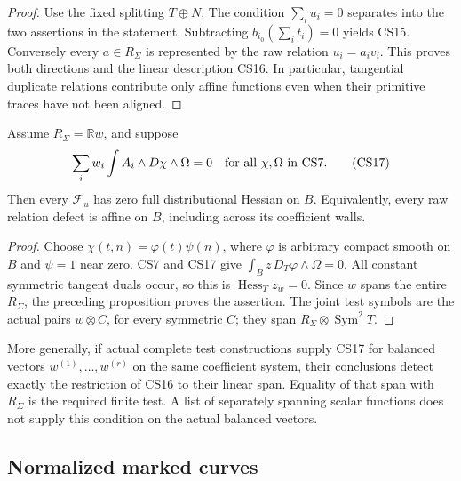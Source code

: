 \begin{proof}
Use the fixed splitting $T\oplus N$.  The condition
$\sum_iu_i=0$ separates into the two assertions in the
statement.  Subtracting $b_{i_0}(\sum_it_i)=0$ yields CS15.
Conversely every $a\in R_\Sigma$ is represented by the raw
relation $u_i=a_iv_i$.  This proves both directions and the
linear description CS16.  In particular, tangential duplicate
relations contribute only affine functions even when their
primitive traces have not been aligned.
\end{proof}

\begin{corollary}
\label{cor:r13-single-balance-full-hessian}
Assume $R_\Sigma=\mathbb Rw$, and suppose
\[
 \sum_iw_i\int A_i\wedge D\chi\wedge\Omega=0
       \quad\hbox{for all }\chi,\Omega\hbox{ in CS7}.
 \tag{CS17}
\]
Then every $\mathcal F_u$ has zero full distributional Hessian
on $B$.  Equivalently, every raw relation defect is affine on
$B$, including across its coefficient walls.
\end{corollary}

\begin{proof}
Choose $\chi(t,n)=\varphi(t)\psi(n)$, where $\varphi$ is
arbitrary compact smooth on $B$ and $\psi=1$ near zero.
CS7 and CS17 give
$\int_Bz\,D_T\varphi\wedge\Omega=0$.  All constant symmetric
tangent duals occur, so this is
$\operatorname{Hess}_Tz_w=0$.  Since $w$ spans the entire
$R_\Sigma$, the preceding proposition proves the assertion.
The joint test symbols are the actual pairs
$w\otimes C$, for every symmetric $C$; they span
$R_\Sigma\otimes\operatorname{Sym}^2T$.
\end{proof}

More generally, if actual complete test constructions supply
CS17 for balanced vectors $w^{(1)},\ldots,w^{(r)}$ on the
same coefficient system, their conclusions detect exactly the
restriction of CS16 to their linear span.  Equality of that
span with $R_\Sigma$ is the required finite test.  A list of
separately spanning scalar functions does not supply this
condition on the actual balanced vectors.

\subsection{Normalized marked curves}

